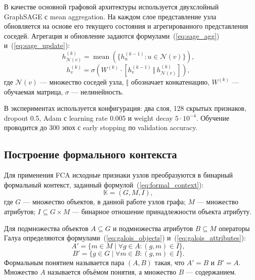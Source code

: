 \documentclass[14pt,a4paper]{extarticle}
\begin{document}
В качестве основной графовой архитектуры используется двухслойный GraphSAGE с
mean aggregation. На каждом слое представление узла обновляется на основе его
текущего состояния и агрегированного представления соседей. Агрегация и
обновление задаются формулами~(\ref{eq:sage_agg}) и~(\ref{eq:sage_update}):
\begin{equation}
    h_{\mathcal{N}(v)}^{(k)} =
    \operatorname{mean}
    \left(
        \{h_u^{(k-1)}: u \in \mathcal{N}(v)\}
    \right),
    \label{eq:sage_agg}
\end{equation}
\begin{equation}
    h_v^{(k)} =
    \sigma
    \left(
        W^{(k)}
        \cdot
        \left[
            h_v^{(k-1)} \, \Vert \,
            h_{\mathcal{N}(v)}^{(k)}
        \right]
    \right),
    \label{eq:sage_update}
\end{equation}
где $\mathcal{N}(v)$ --- множество соседей узла, $\Vert$ обозначает
конкатенацию, $W^{(k)}$ --- обучаемая матрица, $\sigma$ --- нелинейность.

В экспериментах используется конфигурация: два слоя, 128 скрытых признаков,
dropout 0.5, Adam с learning rate 0.005 и weight decay $5\cdot 10^{-4}$.
Обучение проводится до 300 эпох с early stopping по validation accuracy.

\subsection{Построение формального контекста}

Для применения FCA исходные признаки узлов преобразуются в бинарный формальный
контекст, заданный формулой~(\ref{eq:formal_context}):
\begin{equation}
    \mathbb{K} = (G, M, I),
    \label{eq:formal_context}
\end{equation}
где $G$ --- множество объектов, в данной работе узлов графа; $M$ --- множество
атрибутов; $I \subseteq G \times M$ --- бинарное отношение принадлежности
объекта атрибуту.

Для подмножества объектов $A \subseteq G$ и подмножества атрибутов
$B \subseteq M$ операторы Галуа определяются формулами~(\ref{eq:galois_objects})
и~(\ref{eq:galois_attributes}):
\begin{equation}
    A' = \{m \in M \mid \forall g \in A: (g,m) \in I\},
    \label{eq:galois_objects}
\end{equation}
\begin{equation}
    B' = \{g \in G \mid \forall m \in B: (g,m) \in I\}.
    \label{eq:galois_attributes}
\end{equation}
Формальным понятием называется пара $(A,B)$ такая, что $A'=B$ и $B'=A$.
Множество $A$ называется объёмом понятия, а множество $B$ --- содержанием.
\end{document}
